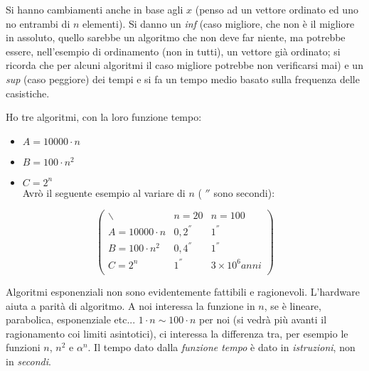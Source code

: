 \documentclass[a4paper,12pt,oneside,tikz]{book}
\begin{document}
Si hanno cambiamenti anche in base agli $x$ (penso ad un vettore ordinato ed uno no entrambi di $n$ elementi). Si danno un \textit{inf} (caso migliore, che non è il migliore in assoluto, quello sarebbe un algoritmo che non deve far niente, ma potrebbe essere, nell'esempio di ordinamento (non in tutti), un vettore già ordinato; si ricorda che per alcuni algoritmi il caso migliore potrebbe non verificarsi mai) e un \textit{sup} (caso peggiore) dei tempi e si fa un tempo medio basato sulla frequenza delle casistiche.\\
\begin{esempio}
Ho tre algoritmi, con la loro funzione tempo:
\begin{itemize}
\item $A=10000\cdot n$
\item $B=100\cdot n^2$
\item $C=2^n$\\
Avrò il seguente esempio al variare di $n$ ( $''$ sono secondi):
\end{itemize}
$$\left(\begin{matrix}
\backslash & n=20 & n=100\\
A=10000\cdot n & 0,2^{''} & 1^{''}\\
B=100\cdot n^2 &  0,4^{''} & 1^{''}\\
C=2^n &  1^{''} & 3\times 10^{6} anni\\
\end{matrix}\right)$$
\end{esempio}
Algoritmi esponenziali non sono evidentemente fattibili e ragionevoli.
\newpage
L'hardware aiuta a parità di algoritmo.
A noi interessa la funzione in $n$, se è lineare, parabolica, esponenziale etc... $1\cdot n\sim 100\cdot n$ per noi (si vedrà più avanti il ragionamento coi limiti asintotici), ci interessa la differenza tra, per esempio le funzioni $n$, $n^2$ e $\alpha^n$. Il tempo dato dalla \textit{funzione tempo} è dato in \textit{istruzioni}, non in \textit{secondi}.\\
\end{document}
